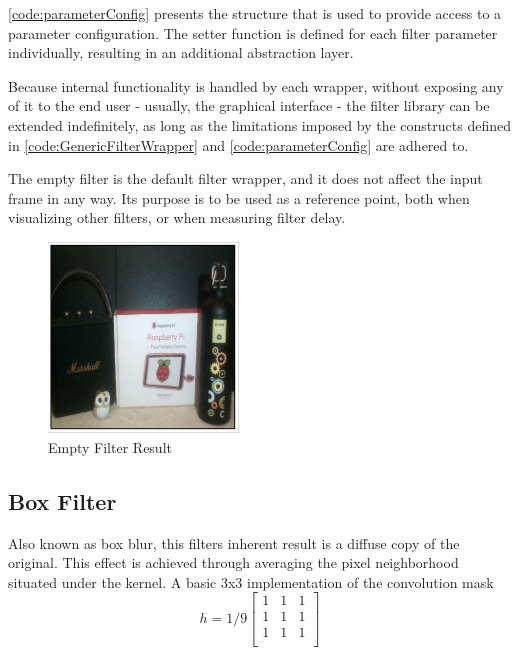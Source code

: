 \cref{code:parameterConfig} presents the structure that is used to provide access to a parameter
configuration. The setter function is defined for each filter parameter individually, resulting in an
additional abstraction layer.

Because internal functionality is handled by each wrapper, without exposing any of it to the end
user - usually, the graphical interface - the filter library can be extended indefinitely, as long as
the limitations imposed by the constructs defined in \cref{code:GenericFilterWrapper} and
\cref{code:parameterConfig} are adhered to.

The empty filter is the default filter wrapper, and it does not affect the input frame in any way. Its
purpose is to be used as a reference point, both when visualizing other filters, or when measuring filter
delay.

\begin{figure}[H]
	\includegraphics[width=0.45\textwidth, height=0.45\textwidth]{resources/Empty_4.png}
	\caption{Empty Filter Result}
\end{figure}

\subsection{Box Filter}

Also known as box blur, this filters inherent result is a diffuse copy of the original. This effect is
achieved through averaging the pixel neighborhood situated under the kernel. A basic 3x3 implementation
of the convolution mask \cite{ispBook}
\begin{equation}
	h = 1/9
	\begin{bmatrix}
		1 & 1 & 1 \\
		1 & 1 & 1 \\
		1 & 1 & 1 \\
	\end{bmatrix}
\end{equation}

